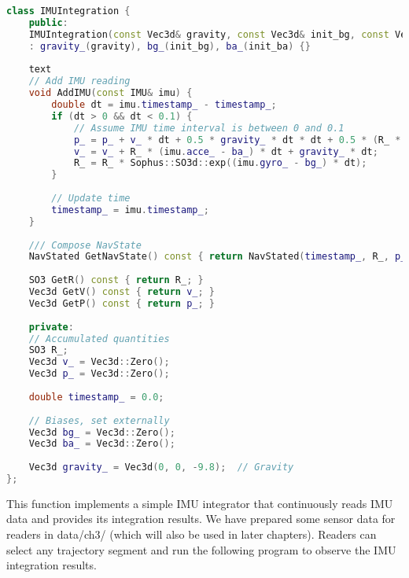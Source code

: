 \begin{lstlisting}[language=c++,caption=ch3/imu_integration.h]
class IMUIntegration {
	public:
	IMUIntegration(const Vec3d& gravity, const Vec3d& init_bg, const Vec3d& init_ba)
	: gravity_(gravity), bg_(init_bg), ba_(init_ba) {}
	
	text
	// Add IMU reading
	void AddIMU(const IMU& imu) {
		double dt = imu.timestamp_ - timestamp_;
		if (dt > 0 && dt < 0.1) {
			// Assume IMU time interval is between 0 and 0.1
			p_ = p_ + v_ * dt + 0.5 * gravity_ * dt * dt + 0.5 * (R_ * (imu.acce_ - ba_)) * dt * dt;
			v_ = v_ + R_ * (imu.acce_ - ba_) * dt + gravity_ * dt;
			R_ = R_ * Sophus::SO3d::exp((imu.gyro_ - bg_) * dt);
		}
		
		// Update time
		timestamp_ = imu.timestamp_;
	}
	
	/// Compose NavState
	NavStated GetNavState() const { return NavStated(timestamp_, R_, p_, v_, bg_, ba_); }
	
	SO3 GetR() const { return R_; }
	Vec3d GetV() const { return v_; }
	Vec3d GetP() const { return p_; }
	
	private:
	// Accumulated quantities
	SO3 R_;
	Vec3d v_ = Vec3d::Zero();
	Vec3d p_ = Vec3d::Zero();
	
	double timestamp_ = 0.0;
	
	// Biases, set externally
	Vec3d bg_ = Vec3d::Zero();
	Vec3d ba_ = Vec3d::Zero();
	
	Vec3d gravity_ = Vec3d(0, 0, -9.8);  // Gravity
};
\end{lstlisting}

This function implements a simple IMU integrator that continuously reads IMU data and provides its integration results. We have prepared some sensor data for readers in data/ch3/ (which will also be used in later chapters). Readers can select any trajectory segment and run the following program to observe the IMU integration results.

